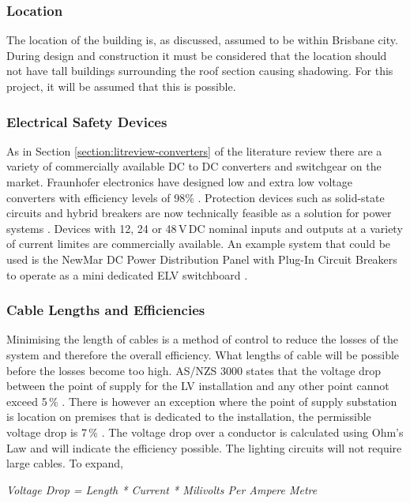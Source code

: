 \subsubsection{Location}

The location of the building is, as discussed, assumed to be within Brisbane city. During design and construction it must be considered that the location should not have tall buildings surrounding the roof section causing shadowing. For this project, it will be assumed that this is possible. 

\subsubsection{Electrical Safety Devices}

As in Section \ref{section:litreview-converters} of the literature review there are a variety of commercially available DC to DC converters and switchgear on the market. Fraunhofer electronics have designed low and extra low voltage converters with efficiency levels of 98\% \cite{website:Fraunhofer}. Protection devices such as solid-state circuits and hybrid breakers are now technically feasible as a solution for power systems \cite{Sechilariu2015}. Devices with 12, 24 or 48\,V\,DC nominal inputs and outputs at a variety of current limites are commercially available. An example system that could be used is the NewMar DC Power Distribution Panel with Plug-In Circuit Breakers to operate as a mini dedicated ELV switchboard \cite{website:PoweringTheNetwork}.      

\subsubsection{Cable Lengths and Efficiencies}

Minimising the length of cables is a method of control to reduce the losses of the system and therefore the overall efficiency. What lengths of cable will be possible before the losses become too high. AS/NZS 3000 states that the voltage drop between the point of supply for the LV installation and any other point cannot exceed 5\,\% \cite{StandardsAustralia2007}. There is however an exception where the point of supply substation is location on premises that is dedicated to the installation, the permissible voltage drop is 7\,\% \cite{StandardsAustralia2007}. The voltage drop over a conductor is calculated using Ohm's Law and will indicate the efficiency possible. The lighting circuits will not require large cables. To expand,
\begin{center}
	\textit{Voltage Drop = Length * Current * Milivolts Per Ampere Metre}\cite{website:triCAB}
\end{center}  


